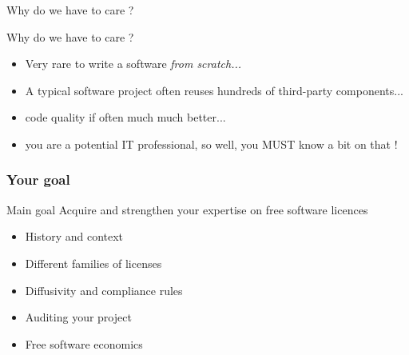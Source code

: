 \documentclass{beamer}
\begin{document}
\begin{frame}[plain]%
%  
\end{frame}

\begin{frame}{Why do we have to care ?}
  \begin{alertblock}{Why do we have to care ?}
    \begin{itemize}
    \item Very rare to write a software \emph{from scratch...}
    \item A typical software project often reuses hundreds of
      third-party components...
    \item code quality if often much much better...
    \item you are a potential IT professional, so well, you MUST know a bit on that !
    \end{itemize}

\end{alertblock}
\end{frame}


\begin{frame}
\frametitle{Your goal}
\begin{alertblock}{Main goal}
  Acquire and strengthen your expertise on free software licences
\end{alertblock}


  \begin{itemize}
  \item History and context
  \item Different families of licenses
  \item Diffusivity and compliance rules
  \item Auditing your project
  \item Free software economics
  \end{itemize}
\end{frame}
\end{document}
